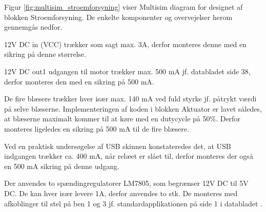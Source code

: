 Figur \ref{fig:multisim_stroemforsyning} viser Multisim diagram for designet af blokken Stroemforsyning. 
De enkelte komponenter og overvejelser herom gennemgås nedfor. 

\clearpage

12V DC in (VCC) trækker som sagt max. 3A, derfor monteres denne med en sikring på denne størrelse. 

12V DC out1 udgangen til motor trækker max. 500 mA jf. databladet \cite{lib:UHD2_DS} side 38, derfor monteres den med en sikring på 500 mA. 

De fire blæsere trækker hver især max. 140 mA ved fuld styrke jf. påtrykt værdi på selve blæserne. 
Implementeringen af koden i blokken Aktuator er lavet således, at blæserne maximalt kommer til at køre med en dutycycle på 50\%. 
Derfor monteres ligeledes en sikring på 500 mA til de fire blæsere. 

Ved en praktisk undersøgelse af USB skinnen konstateredes det, at USB indgangen trækker ca. 400 mA, når relæet er slået til, derfor monteres der også en 500 mA sikring på denne udgang. 

Der anvendes to spændingregulatorer LM7805, som begrænser 12V DC til 5V DC. 
De kan hver især levere 1A, derfor anvendes to stk. 
De monteres med afkoblinger til stel på ben 1 og 3 jf. standardapplikationen på side 1 i databladet \cite{lib:LM7805_DS}.

